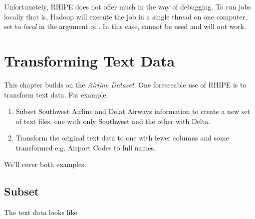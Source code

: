\documentclass[letterpaper,10pt,english]{sphinxmanual}
\begin{document}
Unfortunately, RHIPE does not offer much in the way of debugging. To run jobs
locally that is, Hadoop will execute the job in a single thread on one computer,
set  to \emph{local} in the  argument of . In
this case,  cannot be used and  will not work.
\label{texttransfirm:rhipeserialize}

\chapter{Transforming Text Data}
\label{texttransfirm::doc}\label{texttransfirm:index-2}\label{texttransfirm:transforming-text-data}
This chapter builds on the \emph{Airline Dataset}. One foreseeable use of RHIPE is
to transform text data. For example,
\begin{enumerate}
\item {} 
Subset Southwest Airline and Delat Airways information to create a new set of text files, one with only Southwest and the other with Delta.

\item {} 
Transform the original text data to one with fewer columns and some transformed e.g. Airport Codes to full names.

\end{enumerate}

We'll cover both examples.

\section{Subset}
\label{texttransfirm:subset}\label{texttransfirm:index-3}
The text data looks like
\end{document}
